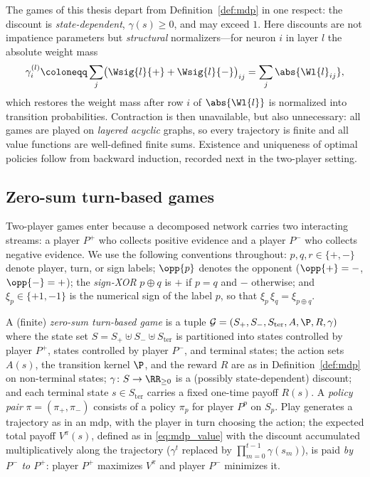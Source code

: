 \begin{remark}\label{rem:structural_discount}
The games of this thesis depart from Definition~\ref{def:mdp} in one respect: the discount is \emph{state-dependent}, $\gamma(s) \ge 0$, and may exceed $1$. Here discounts are not impatience parameters but \emph{structural} normalizers---for neuron $i$ in layer $l$ the absolute weight mass
\begin{equation}
	\gamma^{(l)}_i \coloneqq \sum_{j} \bigl( \Wsig{l}{+} + \Wsig{l}{-} \bigr)_{ij} = \sum_j \abs{\Wl{l}_{ij}},
	\label{eq:structural_discount}
\end{equation}
which restores the weight mass after row $i$ of $\abs{\Wl{l}}$ is normalized into transition probabilities. Contraction is then unavailable, but also unnecessary: all games are played on \emph{layered acyclic} graphs, so every trajectory is finite and all value functions are well-defined finite sums. Existence and uniqueness of optimal policies follow from backward induction, recorded next in the two-player setting.
\end{remark}

\subsection*{Zero-sum turn-based games}

Two-player games enter because a decomposed network carries two interacting streams: a player $P^{+}$ who collects positive evidence and a player $P^{-}$ who collects negative evidence. We use the following conventions throughout: $p, q, r \in \{+, -\}$ denote player, turn, or sign labels; $\opp{p}$ denotes the opponent ($\opp{+} = -$, $\opp{-} = +$); the \emph{sign-XOR} $p \oplus q$ is $+$ if $p = q$ and $-$ otherwise; and $\xi_{p} \in \{+1, -1\}$ is the numerical sign of the label $p$, so that $\xi_{p}\, \xi_{q} = \xi_{p \oplus q}$.

\begin{definition}\label{def:turn_based_game}
A (finite) \emph{zero-sum turn-based game} is a tuple $\mathcal{G} = (S_{+}, S_{-}, S_{\mathrm{ter}}, A, \P, R, \gamma)$ where the state set $S = S_{+} \uplus S_{-} \uplus S_{\mathrm{ter}}$ is partitioned into states controlled by player $P^{+}$, states controlled by player $P^{-}$, and terminal states; the action sets $A(s)$, the transition kernel $\P$, and the reward $R$ are as in Definition~\ref{def:mdp} on non-terminal states; $\gamma \colon S \to \RR_{\ge 0}$ is a (possibly state-dependent) discount; and each terminal state $s \in S_{\mathrm{ter}}$ carries a fixed one-time payoff $R(s)$. A \emph{policy pair} $\pi = (\pi_{+}, \pi_{-})$ consists of a policy $\pi_{p}$ for player $P^{p}$ on $S_{p}$. Play generates a trajectory as in an \ac{mdp}, with the player in turn choosing the action; the expected total payoff $V^{\pi}(s)$, defined as in \eqref{eq:mdp_value} with the discount accumulated multiplicatively along the trajectory ($\gamma^t$ replaced by $\prod_{m=0}^{t-1}\gamma(s_m)$), is paid \emph{by $P^{-}$ to $P^{+}$}: player $P^{+}$ maximizes $V^{\pi}$ and player $P^{-}$ minimizes it.
\end{definition}

